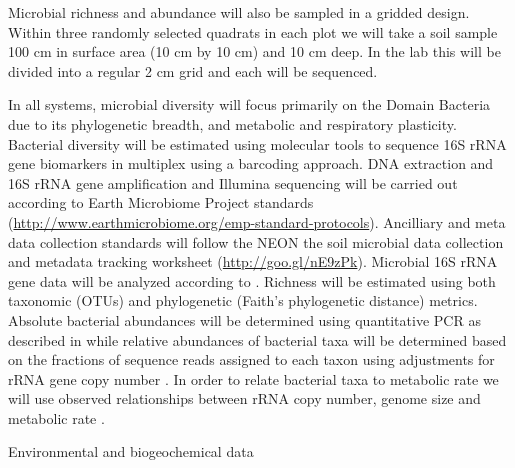 \documentclass[11pt]{article}
\makeatletter
\renewcommand{\paragraph}{\@startsection{paragraph}{4}{\z@}
  {1ex \@plus 1ex \@minus .2ex}{-1em}
  {\normalfont\normalsize\it}
}
\makeatother
\begin{document}
Microbial richness and abundance will also be sampled in a gridded
design.  Within three randomly selected quadrats in each plot we will
take a soil sample 100 cm in surface area (10 cm by 10 cm) and 10 cm
deep.  In the lab this will be divided into a regular 2 cm grid and
each will be sequenced.

In all systems, microbial diversity will focus primarily on the Domain
Bacteria due to its phylogenetic breadth, and metabolic and
respiratory plasticity. Bacterial diversity will be estimated using
molecular tools to sequence 16S rRNA gene biomarkers in multiplex
using a barcoding approach. DNA extraction and 16S rRNA gene
amplification and Illumina sequencing will be carried out according to
Earth Microbiome Project standards
(\url{http://www.earthmicrobiome.org/emp-standard-protocols}). Ancilliary
and meta data collection standards will follow the NEON the soil
microbial data collection and metadata tracking worksheet
(\url{http://goo.gl/nE9zPk}).  Microbial 16S rRNA gene data will be
analyzed according to \citet{shi2015}. Richness will be estimated
using both taxonomic (OTUs) and phylogenetic (Faith's phylogenetic
distance) metrics. Absolute bacterial abundances will be determined
using quantitative PCR as described in \citep{shi2015} while relative
abundances of bacterial taxa will be determined based on the fractions
of sequence reads assigned to each taxon using adjustments for rRNA
gene copy number \citep{kembel2012}.  In order to relate bacterial
taxa to metabolic rate we will use observed relationships between rRNA
copy number, genome size and metabolic rate \citep{delong2010}.



\paragraph{Environmental and biogeochemical data}
\end{document}
